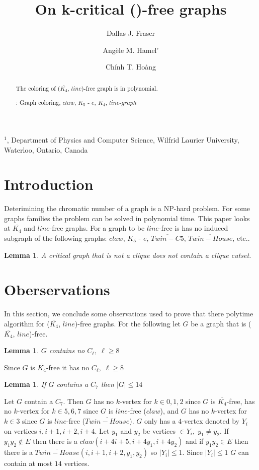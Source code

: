 \documentclass[12pt]{article}
\title{On k-critical ({\FAM})-free graphs}
\author{
	Dallas J. Fraser\inst{1}
	\and Ang\`ele M. Hamel'\inst{1}
	\and Ch\'inh T. Ho\`ang\inst{1}
}
\newtheorem{Lemma}[Theorem]{Lemma}
\def\inst#1{$^{#1}$}
\def\FAM{($\overline{K_4}$, $line$)}
\begin{document}
\maketitle

\begin{center}
{\footnotesize

\inst{1}, Department of Physics and Computer Science, Wilfrid Laurier
University, \\Waterloo, Ontario, Canada}

\end{center}

\begin{abstract}
The coloring of {\FAM}-free graph is in polynomial.

: Graph coloring, $claw$, $K_5$ - $e$, $\overline{K_4}$, $line$-$graph$ 
\end{abstract}


\section{Introduction}\label{sec:intro}
Deterimining the chromatic number of a graph is a NP-hard problem. For some graphs families the problem can be solved in polynomial time. This paper looks at $\overline{K_4}$ and $line$-free graphs. For a graph to be $line$-free is has no induced subgraph of the following graphs: $claw$, $K_5$ - $e$, $\overline{Twin-C5}$, $\overline{Twin-House}$, etc..

\begin{Lemma}\label{lem:cliqueCutset}
A critical graph that is not a clique does not contain a clique
cutset.
\end{Lemma}

\section{Oberservations}\label{sec:observations}
In this section, we conclude some observations used to prove that there polytime algorithm for {\FAM}-free graphs. For the following let $G$ be a graph that is {\FAM}-free.

\begin{Lemma}\label{lem:cl-free}
$G$ contains no $C_\ell,\; \ell \geq 8$
\end{Lemma}
 Since $G$ is $\overline{K_4}$-free it has no $C_\ell,\; \ell \geq 8$

\begin{Lemma}\label{lem:c7-bounded}
If $G$ contains a $C_7$ then $|G| \leq 14$
\end{Lemma}
 Let $G$ contain a $C_7$. Then $G$ has no $k$-vertex for $k \in {0, 1, 2}$ since $G$ is $\overline{K_4}$-free, has no $k$-vertex for $k \in {5, 6,7}$ since $G$ is $line$-free ($claw$), and $G$ has no $k$-vertex for $k \in {3}$ since $G$ is $line$-free ($\overline{Twin-House}$). $G$ only has a $4$-vertex denoted by $Y_i$ on vertices $i,i+1,i+2,i+4$. Let $y_1$ and $y_2$ be vertices $\in Y_i,\; y_1 \neq y_2$. If $y_1y_2 \not \in E$ then there is a $claw (i+4i+5,i+4y_1,i+4y_2)$ and if $y_1y_2 \in E$ then there is a $\overline{Twin-House}(i,i+1,i+2,y_1,y_2)$ so $|Y_i| \leq 1$. Since $|Y_i| \leq 1$ $G$ can contain at most $14$ vertices.
\end{document}
